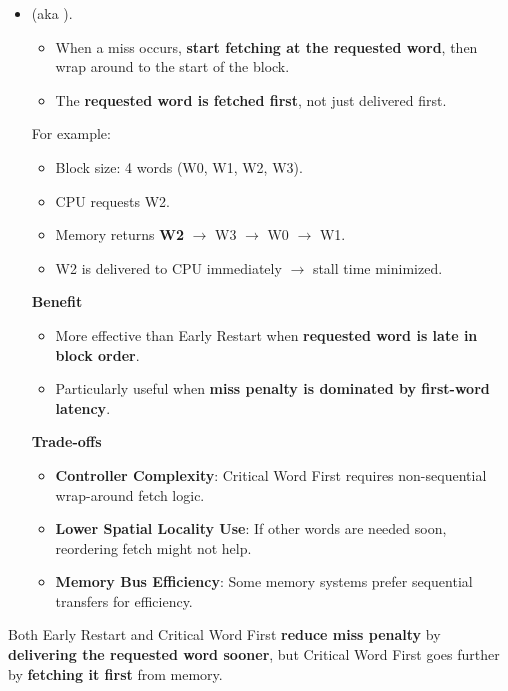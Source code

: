 \begin{itemize}
    \item {} (aka ).
    \begin{itemize}
        \item When a miss occurs, \textbf{start fetching at the requested word}, then wrap around to the start of the block.
        \item The \textbf{requested word is fetched first}, not just delivered first.
    \end{itemize}
    For example:
    \begin{itemize}
        \item Block size: 4 words (W0, W1, W2, W3).
        \item CPU requests W2.
        \item Memory returns \textbf{W2} $\rightarrow$ W3 $\rightarrow$ W0 $\rightarrow$ W1.
        \item W2 is delivered to CPU immediately $\rightarrow$ stall time minimized.
    \end{itemize}
    \begin{flushleft}
        \textcolor{Green3}{ \textbf{Benefit}}
    \end{flushleft}
    \begin{itemize}
        \item[\textcolor{Green3}{\faIcon{check}}] More effective than Early Restart when \textbf{requested word is late in block order}.
        \item[\textcolor{Green3}{\faIcon{check}}] Particularly useful when \textbf{miss penalty is dominated by first-word latency}.
    \end{itemize}
    \begin{flushleft}
        \textcolor{Red2}{ \textbf{Trade-offs}}
    \end{flushleft}
    \begin{itemize}
        \item[\textcolor{Red2}{\faIcon{times}}] \textbf{Controller Complexity}: Critical Word First requires non-sequen\-tial wrap-around fetch logic.
        \item[\textcolor{Red2}{\faIcon{times}}] \textbf{Lower Spatial Locality Use}: If other words are needed soon, reordering fetch might not help.
        \item[\textcolor{Red2}{\faIcon{times}}] \textbf{Memory Bus Efficiency}: Some memory systems prefer sequential transfers for efficiency.
    \end{itemize}
\end{itemize}
Both Early Restart and Critical Word First \textbf{reduce miss penalty} by \textbf{delivering the requested word sooner}, but Critical Word First goes further by \textbf{fetching it first} from memory.